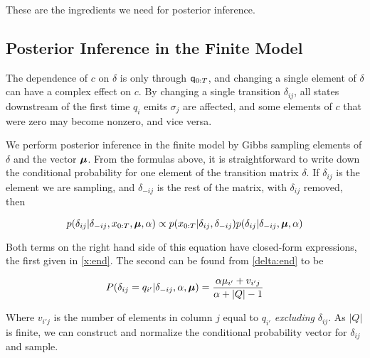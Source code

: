 

These are the ingredients we need for posterior inference.
 
 \subsection{Posterior Inference in the Finite Model}
 
 The dependence of $c$ on $\delta$ is only through $\q_{0:T}$, and changing a single element of $\delta$ can have a complex effect on $c$.  By changing a single transition $\delta_{ij}$, all states downstream of the first time $q_i$ emits $\sigma_j$ are affected, and some elements of $c$ that were zero may become nonzero, and vice versa.
 
We perform posterior inference in the finite model by Gibbs sampling elements of $\delta$ and the vector $\bmu$.  From the formulas above, it is straightforward to write down the conditional probability for one element of the transition matrix $\delta$.  If $\delta_{ij}$ is the element we are sampling, and $\delta_{-ij}$ is the rest of the matrix, with $\delta_{ij}$ removed, then

\begin{equation}
p(\delta_{ij}|\delta_{-ij},x_{0:T},\bmu,\alpha) \propto p(x_{0:T}|\delta_{ij},\delta_{-ij})p(\delta_{ij}|\delta_{-ij},\bmu,\alpha) \label{delta:cond}
\end{equation}

Both terms on the right hand side of this equation have closed-form expressions, the first given in \eqref{x:end}.  The second can be found from \eqref{delta:end} to be

\begin{equation}
P(\delta_{ij} = q_{i'}|\delta_{-ij},\alpha,\bmu) = \frac{\alpha\mu_{i'} + v_{i'j}}{\alpha + |Q| - 1} \label{delta:pred}
\end{equation}

Where $v_{i'j}$ is the number of elements in column $j$ equal to $q_{i'}$ {\em excluding} $\delta_{ij}$.  As $|Q|$ is finite, we can construct and normalize the conditional probability vector for $\delta_{ij}$ and sample.

